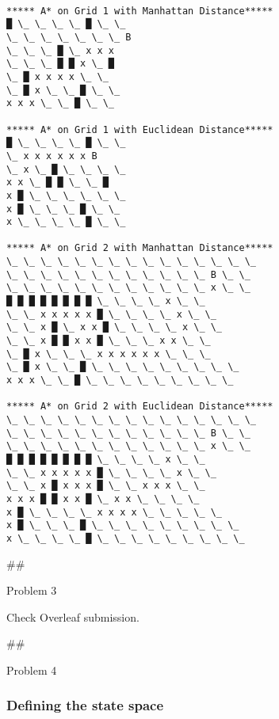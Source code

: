 \documentclass[11pt]{article}
\begin{document}
    \begin{Verbatim}[commandchars=\\\{\}]

***** A* on Grid 1 with Manhattan Distance*****
█ \_ \_ \_ \_ █ \_ \_
\_ \_ \_ \_ \_ \_ \_ B
\_ \_ \_ █ \_ x x x
\_ \_ \_ █ █ x \_ █
\_ █ x x x x \_ \_
\_ █ x \_ \_ █ \_ \_
x x x \_ \_ █ \_ \_

***** A* on Grid 1 with Euclidean Distance*****
█ \_ \_ \_ \_ █ \_ \_
\_ x x x x x x B
\_ x \_ █ \_ \_ \_ \_
x x \_ █ █ \_ \_ █
x █ \_ \_ \_ \_ \_ \_
x █ \_ \_ \_ █ \_ \_
x \_ \_ \_ \_ █ \_ \_

***** A* on Grid 2 with Manhattan Distance*****
\_ \_ \_ \_ \_ \_ \_ \_ \_ \_ \_ \_ \_ \_ \_
\_ \_ \_ \_ \_ \_ \_ \_ \_ \_ \_ \_ B \_ \_
\_ \_ \_ \_ \_ \_ \_ \_ \_ \_ \_ \_ x \_ \_
█ █ █ █ █ █ █ █ \_ \_ \_ \_ x \_ \_
\_ \_ x x x x x █ \_ \_ \_ \_ x \_ \_
\_ \_ x █ \_ x x █ \_ \_ \_ \_ x \_ \_
\_ \_ x █ █ x x █ \_ \_ \_ x x \_ \_
\_ █ x \_ \_ \_ x x x x x x \_ \_ \_
\_ █ x \_ \_ █ \_ \_ \_ \_ \_ \_ \_ \_ \_
x x x \_ \_ █ \_ \_ \_ \_ \_ \_ \_ \_ \_

***** A* on Grid 2 with Euclidean Distance*****
\_ \_ \_ \_ \_ \_ \_ \_ \_ \_ \_ \_ \_ \_ \_
\_ \_ \_ \_ \_ \_ \_ \_ \_ \_ \_ \_ B \_ \_
\_ \_ \_ \_ \_ \_ \_ \_ \_ \_ \_ \_ x \_ \_
█ █ █ █ █ █ █ █ \_ \_ \_ \_ x \_ \_
\_ \_ x x x x x █ \_ \_ \_ \_ x \_ \_
\_ \_ x █ x x x █ \_ \_ x x x \_ \_
x x x █ █ x x █ \_ x x \_ \_ \_ \_
x █ \_ \_ \_ \_ x x x x \_ \_ \_ \_ \_
x █ \_ \_ \_ █ \_ \_ \_ \_ \_ \_ \_ \_ \_
x \_ \_ \_ \_ █ \_ \_ \_ \_ \_ \_ \_ \_ \_

    \end{Verbatim}

    \#\#

Problem 3

    Check Overleaf submission.

    \#\#

Problem 4

    \hypertarget{defining-the-state-space}{%
\subsubsection{Defining the state
space}\label{defining-the-state-space}}
\end{document}
